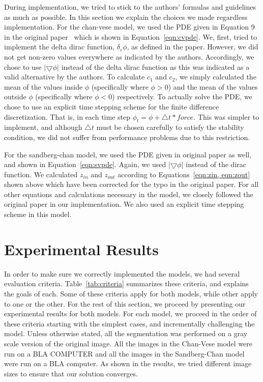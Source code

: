 \documentclass[10pt,twocolumn,letterpaper]{article}
\begin{document}
During implementation, we tried to stick to the authors' formulas and guidelines as much as possible. In this section we explain the choices we made regardless
implementation. For the chan-vese model, we used the PDE given in Equation 9 in the original paper~\cite{chan2001active} which is shown in
Equation~\ref{eqn:cvpde}.  We, first, tried to implement the delta dirac function, $\delta_{\varepsilon}\phi$, as defined in the paper. However, we did not
get non-zero values everywhere as indicated by the authors. Accordingly, we chose to use $|\bigtriangledown\phi|$ instead of the delta dirac function as this
was indicated as a valid alternative by the authors. To calculate $c_{1}$ and $c_{2}$, we simply calculated the mean of the values inside $\phi$ (specifically
where $\phi > 0$) and the mean of the values outside $\phi$ (specifically where $\phi < 0$) respectively. To actually solve the PDE, we chose to use an explicit
time stepping scheme for the finite difference discretization. That is, in each time step $\phi_{t} = \phi + \triangle t*force$. This was simpler to implement,
and although $\triangle t$ must be chosen carefully to satisfy the stability condition, we did not suffer from performance problems due to this restriction.

For the sandberg-chan model, we used the PDE given in original paper as well, and shown in Equation~\ref{eqn:svpde}. Again, we used $|\bigtriangledown\phi|$
instead of the dirac function. We calculated $z_{in}$ and $z_{out}$ according to Equations~\ref{eqn:zin, eqn:zout} shown above which have been corrected for
the typo in the original paper. For all other equations and calculations necessary in the model, we closely followed the original paper in our implementation.
We also used an explicit time stepping scheme in this model. 


\section{Experimental Results}
\label{sec:results}

In order to make sure we correctly implemented the models, we had several evaluation criteria. Table~\ref{tab:criteria} summarizes these criteria, and explains
the goals of each. Some of these criteria apply for both models, while other apply to one or the other. For the rest of this section, we proceed by presenting
our experimental results for both models. For each model, we proceed in the order of these criteria starting with the simplest
cases, and incrementally challenging the model. Unless otherwise stated, all the segmentation was performed on a gray scale version of the original image. All
the images in the Chan-Vese model were run on a BLA COMPUTER and all the images in the Sandberg-Chan model were run on a BLA computer. As shown in the results,
we tried different image sizes to ensure that our solution converges.
\end{document}
